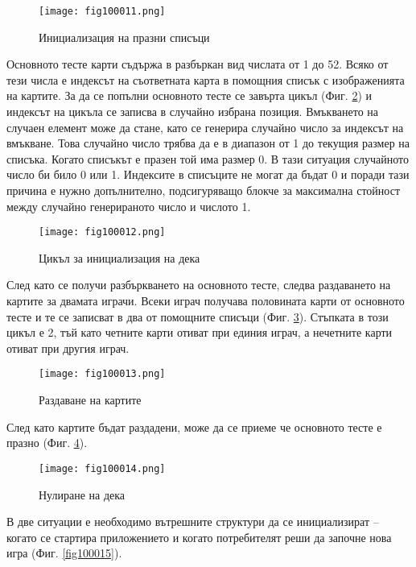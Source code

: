 \begin{figure}[H]
  \centering
  \texttt{[image: fig100011.png]}
  \caption{Инициализация на празни списъци}
\label{fig100011}
\end{figure}

Основното тесте карти съдържа в разбъркан вид числата от 1 до 52. Всяко от тези числа е индексът на съответната карта в помощния списък с изображенията на картите. За да се попълни основното тесте се завърта цикъл (Фиг. \ref{fig100012}) и индексът на цикъла се записва в случайно избрана позиция. Вмъкването на случаен елемент може да стане, като се генерира случайно число за индексът на вмъкване. Това случайно число трябва да е в диапазон от 1 до текущия размер на списъка. Когато списъкът е празен той има размер 0. В тази ситуация случайното число би било 0 или 1. Индексите в списъците не могат да бъдат 0 и поради тази причина е нужно допълнително, подсигуряващо блокче за максимална стойност между случайно генерираното число и числото 1.

\begin{figure}[H]
  \centering
  \texttt{[image: fig100012.png]}
  \caption{Цикъл за инициализация на дека}
\label{fig100012}
\end{figure}

След като се получи разбъркването на основното тесте, следва раздаването на картите за двамата играчи. Всеки играч получава половината карти от основното тесте и те се записват в два от помощните списъци (Фиг. \ref{fig100013}). Стъпката в този цикъл е 2, тъй като четните карти отиват при единия играч, а нечетните карти отиват при другия играч. 

\begin{figure}[H]
  \centering
  \texttt{[image: fig100013.png]}
  \caption{Раздаване на картите}
\label{fig100013}
\end{figure}

След като картите бъдат раздадени, може да се приеме че основното тесте е празно (Фиг. \ref{fig100014}). 

\begin{figure}[H]
  \centering
  \texttt{[image: fig100014.png]}
  \caption{Нулиране на дека}
\label{fig100014}
\end{figure}

В две ситуации е необходимо вътрешните структури да се инициализират – когато се стартира приложението и когато потребителят реши да започне нова игра (Фиг. \ref{fig100015}).

